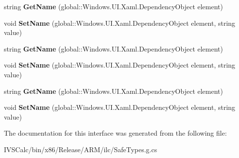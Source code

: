 \begin{DoxyCompactItemize}
string {\bfseries Get\+Name} (global\+::\+Windows.\+U\+I.\+Xaml.\+Dependency\+Object element)
\item 
\mbox{\label{interface_windows_1_1_u_i_1_1_xaml_1_1_automation_1_1_i_automation_properties_statics_a690836151f64613c105b33e1b27517fd}} 
void {\bfseries Set\+Name} (global\+::\+Windows.\+U\+I.\+Xaml.\+Dependency\+Object element, string value)
\item 
\mbox{\label{interface_windows_1_1_u_i_1_1_xaml_1_1_automation_1_1_i_automation_properties_statics_ace600cd5145b2141aa2691bffaa46ed0}} 
string {\bfseries Get\+Name} (global\+::\+Windows.\+U\+I.\+Xaml.\+Dependency\+Object element)
\item 
\mbox{\label{interface_windows_1_1_u_i_1_1_xaml_1_1_automation_1_1_i_automation_properties_statics_a690836151f64613c105b33e1b27517fd}} 
void {\bfseries Set\+Name} (global\+::\+Windows.\+U\+I.\+Xaml.\+Dependency\+Object element, string value)
\item 
\mbox{\label{interface_windows_1_1_u_i_1_1_xaml_1_1_automation_1_1_i_automation_properties_statics_ace600cd5145b2141aa2691bffaa46ed0}} 
string {\bfseries Get\+Name} (global\+::\+Windows.\+U\+I.\+Xaml.\+Dependency\+Object element)
\item 
\mbox{\label{interface_windows_1_1_u_i_1_1_xaml_1_1_automation_1_1_i_automation_properties_statics_a690836151f64613c105b33e1b27517fd}} 
void {\bfseries Set\+Name} (global\+::\+Windows.\+U\+I.\+Xaml.\+Dependency\+Object element, string value)
\end{DoxyCompactItemize}


The documentation for this interface was generated from the following file\+:\begin{DoxyCompactItemize}
\item 
I\+V\+S\+Calc/bin/x86/\+Release/\+A\+R\+M/ilc/Safe\+Types.\+g.\+cs\end{DoxyCompactItemize}
